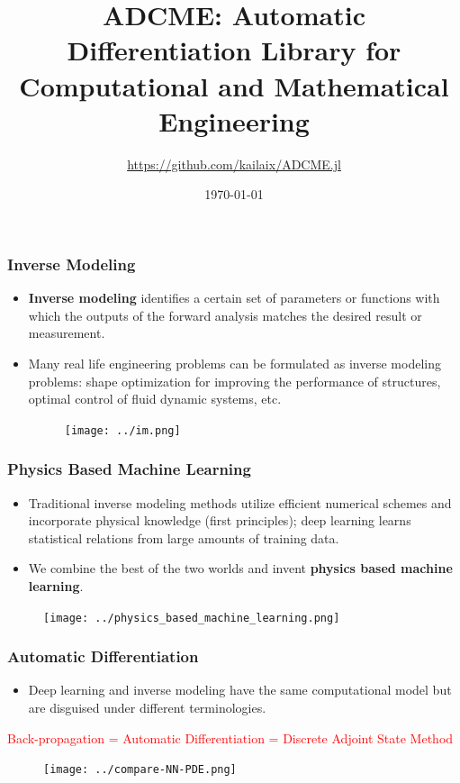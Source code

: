 \documentclass{beamer}
\title[ADCME]{ADCME: Automatic Differentiation Library for Computational and Mathematical Engineering} %
\author{\url{https://github.com/kailaix/ADCME.jl}} %
\institute[] %
{
}
\date{\today} %
\begin{document}
\begin{frame}
\titlepage %

\end{frame}


\begin{frame}
	\frametitle{Inverse Modeling}
	\begin{itemize}
		\item \textbf{Inverse modeling} identifies a certain set of parameters or functions with which the outputs of the forward analysis matches the desired result or measurement.
		\item Many real life engineering problems can be formulated as inverse modeling problems: shape optimization for improving the performance of structures, optimal control of fluid dynamic systems, etc.
		\begin{figure}[hbt]
  \texttt{[image: ../im.png]}
\end{figure}

	\end{itemize}
\end{frame}

\begin{frame}
	\frametitle{Physics Based Machine Learning}
	\begin{itemize}
		\item Traditional inverse modeling methods utilize efficient numerical schemes and incorporate physical knowledge (first principles); deep learning learns statistical relations from large amounts of training data.
		\item We combine the best of the two worlds and invent \textbf{physics based machine learning}. 
	\end{itemize}
	\begin{figure}[hbt]
  \texttt{[image: ../physics\_based\_machine\_learning.png]}
\end{figure}
\end{frame}

\begin{frame}
	\frametitle{Automatic Differentiation}
	\begin{itemize}
		\item Deep learning and inverse modeling have the same computational model but are disguised under different terminologies.
	\end{itemize}
	\begin{center}
	\small
	\textcolor{red}{
		Back-propagation = Automatic Differentiation = Discrete Adjoint State Method}
	\end{center}
	\begin{figure}[hbt]
  \texttt{[image: ../compare-NN-PDE.png]}
\end{figure}
\end{frame}
\end{document}
